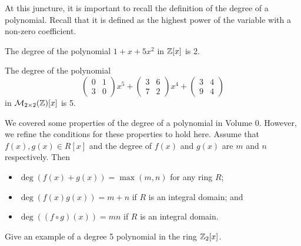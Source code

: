 At this juncture, it is important to recall the definition of the degree of a polynomial. Recall that it is defined as the highest power of the variable with a non-zero coefficient.
\begin{example}
    The degree of the polynomial $1+x+5x^2$ in $\mathbb{Z}[x]$ is 2.
\end{example}
\begin{example}
    The degree of the polynomial
    \[
        \begin{pmatrix}0&1\\3&0\end{pmatrix}x^5 + \begin{pmatrix}3&6\\7&2\end{pmatrix}x^4 + \begin{pmatrix}3&4\\9&4\end{pmatrix}
    \]
    in $\mathcal{M}_{2\times2}(\mathbb{Z})[x]$ is 5.
\end{example}
We covered some properties of the degree of a polynomial in Volume 0. However, we refine the conditions for these properties to hold here. Assume that $f(x), g(x) \in R[x]$ and the degree of $f(x)$ and $g(x)$ are $m$ and $n$ respectively. Then
\begin{itemize}
    \item $\deg(f(x) + g(x)) = \max(m, n)$ for any ring $R$;
    \item $\deg(f(x)g(x)) = m+n$ if $R$ is an integral domain; and
    \item $\deg((f\circ g)(x)) = mn$ if $R$ is an integral domain.
\end{itemize}

\begin{exercise}
    Give an example of a degree 5 polynomial in the ring $\mathbb{Z}_2[x]$.
\end{exercise}


